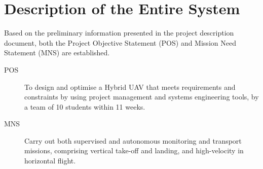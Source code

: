 \begin{comment}
    \begin{itemize}
        \item Performance:
            \begin{itemize}
                \item Payload: 10 kg (12 kg including standard battery package)
                \item Range: 200 km
                \item Velocity: 200 km/hour
                \item Altitude: 120 m (due to present regulation constraints), possibly higher altitude in the future based on regulation changes
                \item Endurance: 1 hour
            \end{itemize}
        \item Safety and Reliability:
            \begin{itemize}
                \item Initial: Remote control within visual line of sight
                \item Goal: Autonomous flight beyond visual line of sight
            \end{itemize}
        \item Sustainability:
            \begin{itemize}
                \item Electric propulsion
            \end{itemize}
        \item Other:
            \begin{itemize}
                \item Payload bay area: 100 x 15 x 15 cm
            \end{itemize}
    \end{itemize}
\end{comment}



\section{Description of the Entire System}
Based on the preliminary information presented in the project description document, both the Project Objective Statement (POS) and Mission Need Statement (MNS) are established.
\begin{description}
    \item[POS] To design and optimise a Hybrid UAV that meets requirements and constraints by using project management and systems engineering tools, by a team of 10 students within 11 weeks.
    \item[MNS] Carry out both supervised and autonomous monitoring and transport missions, comprising vertical take-off and landing, and high-velocity in horizontal flight.
\end{description}